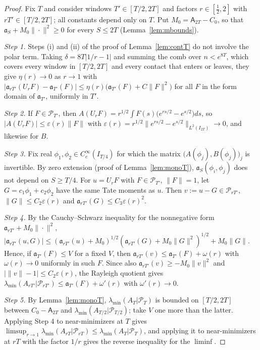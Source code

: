 \documentclass[11pt]{amsart}
\theoremstyle{definition}
\theoremstyle{remark}
\newcommand{\PT}{\mathcal P_T}
\newcommand{\lamA}{\lambda_{\min}(A_T|\PT)}
\begin{document}
\begin{proof}
Fix $T$ and consider windows $T'\in[T/2,2T]$ and factors $r\in[\frac12,2]$ with $rT'\in[T/2,2T]$; all
constants depend only on $T$. Put $M_0=\mathsf A_{2T}-C_0$, so that $\mathfrak a_S+M_0\|\cdot\|^2\ge0$
for every $S\le2T$ (Lemma~\ref{lem:mbounds}).

\emph{Step 1.} Steps (i) and (ii) of the proof of Lemma~\ref{lem:contT} do not involve the polar term.
Taking $\delta=8T|1/r-1|$ and summing the comb over $n<e^{8T}$, which covers every window in
$[T/2,2T]$ and every contact that enters or leaves, they give $\eta(r)\to0$ as $r\to1$ with
$|\mathfrak a_{rT'}(U_rF)-\mathfrak a_{T'}(F)|\le\eta(r)\big(\mathfrak a_{T'}(F)+C\|F\|^2\big)$ for all
$F$ in the form domain of $\mathfrak a_{T'}$, uniformly in $T'$.

\emph{Step 2.} If $F\in\mathcal P_{T'}$, then $A(U_rF)=r^{1/2}\int F(s)\big(e^{rs/2}-e^{s/2}\big)ds$,
so $|A(U_rF)|\le\varepsilon(r)\|F\|$ with $\varepsilon(r)=r^{1/2}\|e^{rs/2}-e^{s/2}\|_{L^2(I_{2T})}\to0$,
and likewise for $B$.

\emph{Step 3.} Fix real $\phi_1,\phi_2\in C_c^\infty(I_{T/4})$ for which the matrix
$\big(A(\phi_j),B(\phi_j)\big)_{j}$ is invertible. By zero extension (proof of Lemma~\ref{lem:monoT}),
$\mathfrak a_S(\phi_i,\phi_j)$ does not depend on $S\ge T/4$. For $u=U_rF$ with $F\in\mathcal P_{T'}$,
$\|F\|=1$, let $G=c_1\phi_1+c_2\phi_2$ have the same Tate moments as $u$. Then
$v:=u-G\in\mathcal P_{rT'}$, $\|G\|\le C_2\varepsilon(r)$ and $\mathfrak a_{rT'}(G)\le C_3\varepsilon(r)^2$.

\emph{Step 4.} By the Cauchy--Schwarz inequality for the nonnegative form
$\mathfrak a_{rT'}+M_0\|\cdot\|^2$,
$|\mathfrak a_{rT'}(u,G)|\le(\mathfrak a_{rT'}(u)+M_0)^{1/2}(\mathfrak a_{rT'}(G)+M_0\|G\|^2)^{1/2}+M_0\|G\|$.
Hence, if $\mathfrak a_{T'}(F)\le V$ for a fixed $V$, then
$\mathfrak a_{rT'}(v)\le\mathfrak a_{T'}(F)+\omega(r)$ with $\omega(r)\to0$ uniformly in such $F$. Since
also $\mathfrak a_{rT'}(v)\ge-M_0\|v\|^2$ and $\big|\|v\|-1\big|\le C_2\varepsilon(r)$, the Rayleigh
quotient gives $\lambda_{\min}(A_{rT'}|\mathcal P_{rT'})\le\mathfrak a_{T'}(F)+\omega'(r)$ with
$\omega'(r)\to0$.

\emph{Step 5.} By Lemma~\ref{lem:monoT}, $\lamA$ is bounded on $[T/2,2T]$ between $C_0-\mathsf A_{2T}$
and $\lambda_{\min}(A_{T/2}|\mathcal P_{T/2})$; take $V$ one more than the latter. Applying Step 4 to
near-minimizers at $T$ gives $\limsup_{r\to1}\lambda_{\min}(A_{rT}|\mathcal P_{rT})\le\lamA$, and applying
it to near-minimizers at $rT$ with the factor $1/r$ gives the reverse inequality for the $\liminf$.
\end{proof}
\end{document}
